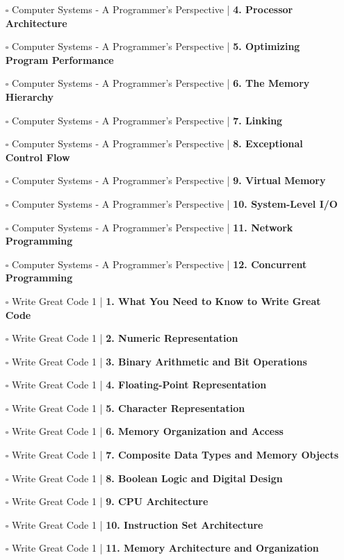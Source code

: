 \documentclass[a4, landscape, 12pt]{article}
\newcommand{\checkbox}{$\square$}%
\begin{document}
\begin{itemize}
{}
\item [\checkbox]  Computer Systems - A Programmer's Perspective  | \textbf{ 4. Processor Architecture
}
\item [\checkbox]  Computer Systems - A Programmer's Perspective  | \textbf{ 5. Optimizing Program Performance
}
\item [\checkbox]  Computer Systems - A Programmer's Perspective  | \textbf{ 6. The Memory Hierarchy
}
\item [\checkbox]  Computer Systems - A Programmer's Perspective  | \textbf{ 7. Linking
}
\item [\checkbox]  Computer Systems - A Programmer's Perspective  | \textbf{ 8. Exceptional Control Flow
}
\item [\checkbox]  Computer Systems - A Programmer's Perspective  | \textbf{ 9. Virtual Memory
}
\item [\checkbox]  Computer Systems - A Programmer's Perspective  | \textbf{ 10. System-Level I/O
}
\item [\checkbox]  Computer Systems - A Programmer's Perspective  | \textbf{ 11. Network Programming
}
\item [\checkbox]  Computer Systems - A Programmer's Perspective  | \textbf{ 12. Concurrent Programming
}
\item [\checkbox]  Write Great Code 1 | \textbf{ 1. What You Need to Know to Write Great Code
}
\item [\checkbox]  Write Great Code 1 | \textbf{ 2. Numeric Representation
}
\item [\checkbox]  Write Great Code 1 | \textbf{ 3. Binary Arithmetic and Bit Operations
}
\item [\checkbox]  Write Great Code 1 | \textbf{ 4. Floating-Point Representation
}
\item [\checkbox]  Write Great Code 1 | \textbf{ 5. Character Representation
}
\item [\checkbox]  Write Great Code 1 | \textbf{ 6. Memory Organization and Access
}
\item [\checkbox]  Write Great Code 1 | \textbf{ 7. Composite Data Types and Memory Objects
}
\item [\checkbox]  Write Great Code 1 | \textbf{ 8. Boolean Logic and Digital Design
}
\item [\checkbox]  Write Great Code 1 | \textbf{ 9. CPU Architecture
}
\item [\checkbox]  Write Great Code 1 | \textbf{ 10. Instruction Set Architecture
}
\item [\checkbox]  Write Great Code 1 | \textbf{ 11. Memory Architecture and Organization
}
\end{itemize}
\end{document}
